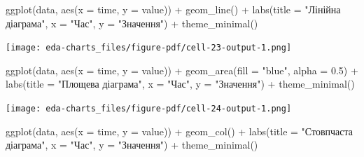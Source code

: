 \documentclass[
  letterpaper,
  DIV=11,
  numbers=noendperiod]{scrreprt}
\newenvironment{Shaded}{\begin{snugshade}}{\end{snugshade}}
\newcommand{\AttributeTok}[1]{\textcolor[rgb]{0.40,0.45,0.13}{#1}}
\newcommand{\FloatTok}[1]{\textcolor[rgb]{0.68,0.00,0.00}{#1}}
\newcommand{\FunctionTok}[1]{\textcolor[rgb]{0.28,0.35,0.67}{#1}}
\newcommand{\NormalTok}[1]{\textcolor[rgb]{0.00,0.23,0.31}{#1}}
\newcommand{\SpecialCharTok}[1]{\textcolor[rgb]{0.37,0.37,0.37}{#1}}
\newcommand{\StringTok}[1]{\textcolor[rgb]{0.13,0.47,0.30}{#1}}
\begin{document}
\begin{Shaded}
\begin{Highlighting}[]
\FunctionTok{ggplot}\NormalTok{(data, }\FunctionTok{aes}\NormalTok{(}\AttributeTok{x =}\NormalTok{ time, }\AttributeTok{y =}\NormalTok{ value)) }\SpecialCharTok{+}
  \FunctionTok{geom\_line}\NormalTok{() }\SpecialCharTok{+}
  \FunctionTok{labs}\NormalTok{(}\AttributeTok{title =} \StringTok{"Лінійна діаграма"}\NormalTok{, }\AttributeTok{x =} \StringTok{"Час"}\NormalTok{, }\AttributeTok{y =} \StringTok{"Значення"}\NormalTok{) }\SpecialCharTok{+}
  \FunctionTok{theme\_minimal}\NormalTok{()}
\end{Highlighting}
\end{Shaded}

\texttt{[image: eda-charts\_files/figure-pdf/cell-23-output-1.png]}

\begin{Shaded}
\begin{Highlighting}[]
\FunctionTok{ggplot}\NormalTok{(data, }\FunctionTok{aes}\NormalTok{(}\AttributeTok{x =}\NormalTok{ time, }\AttributeTok{y =}\NormalTok{ value)) }\SpecialCharTok{+}
  \FunctionTok{geom\_area}\NormalTok{(}\AttributeTok{fill =} \StringTok{"blue"}\NormalTok{, }\AttributeTok{alpha =} \FloatTok{0.5}\NormalTok{) }\SpecialCharTok{+}
  \FunctionTok{labs}\NormalTok{(}\AttributeTok{title =} \StringTok{"Площева діаграма"}\NormalTok{, }\AttributeTok{x =} \StringTok{"Час"}\NormalTok{, }\AttributeTok{y =} \StringTok{"Значення"}\NormalTok{) }\SpecialCharTok{+}
  \FunctionTok{theme\_minimal}\NormalTok{()}
\end{Highlighting}
\end{Shaded}

\texttt{[image: eda-charts\_files/figure-pdf/cell-24-output-1.png]}

\begin{Shaded}
\begin{Highlighting}[]
\FunctionTok{ggplot}\NormalTok{(data, }\FunctionTok{aes}\NormalTok{(}\AttributeTok{x =}\NormalTok{ time, }\AttributeTok{y =}\NormalTok{ value)) }\SpecialCharTok{+}
  \FunctionTok{geom\_col}\NormalTok{() }\SpecialCharTok{+}
  \FunctionTok{labs}\NormalTok{(}\AttributeTok{title =} \StringTok{"Стовпчаста діаграма"}\NormalTok{, }\AttributeTok{x =} \StringTok{"Час"}\NormalTok{, }\AttributeTok{y =} \StringTok{"Значення"}\NormalTok{) }\SpecialCharTok{+}
  \FunctionTok{theme\_minimal}\NormalTok{()}
\end{Highlighting}
\end{Shaded}
\end{document}
